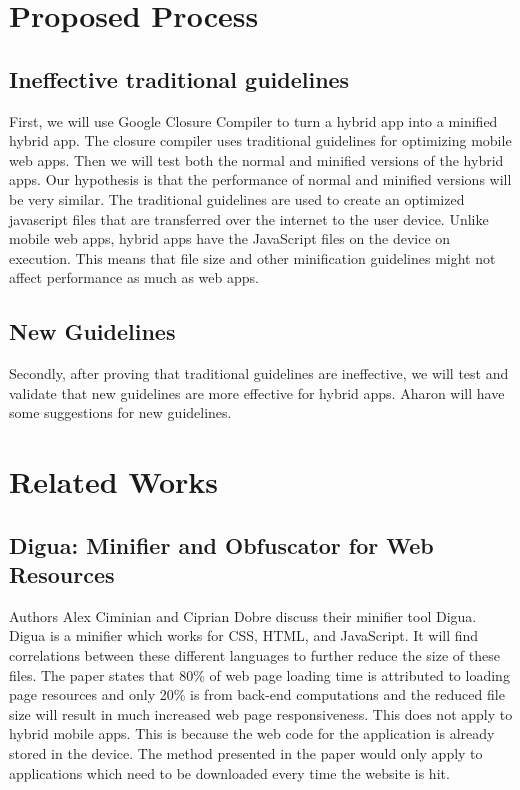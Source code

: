 \documentclass{acm_proc_article-sp}
\begin{document}
\section{Proposed Process}

\subsection{Ineffective traditional guidelines}
First, we will use Google Closure Compiler to turn a hybrid app into a minified hybrid app. The closure compiler uses traditional guidelines for optimizing mobile web apps. Then we will test both the normal and minified versions of the hybrid apps. Our hypothesis is that the performance of normal and minified versions will be very similar. The traditional guidelines are used to create an optimized javascript files that are transferred over the internet to the user device. Unlike mobile web apps, hybrid apps have the JavaScript files on the device on execution. This means that file size and other minification guidelines might not affect performance as much as web apps. 

\subsection{New Guidelines}
Secondly, after proving that traditional guidelines are ineffective, we will test and validate that new guidelines are more effective for hybrid apps. Aharon will have some suggestions for new guidelines.

\section{Related Works}

\subsection{Digua: Minifier and Obfuscator for Web Resources\cite{ciminiandigua} }
Authors Alex Ciminian and Ciprian Dobre discuss their minifier tool Digua.  Digua is a minifier which works for CSS, HTML, and JavaScript.  It will find correlations between these different languages to further reduce the size of these files.  The paper states that 80\% of web page loading time is attributed to loading page resources and only 20\% is from back-end computations and the reduced file size will result in much increased web page responsiveness.  This does not apply to hybrid mobile apps.  This is because the web code for the application is already stored in the device.  The method presented in the paper would only apply to applications which need to be downloaded every time the website is hit. 
\end{document}

